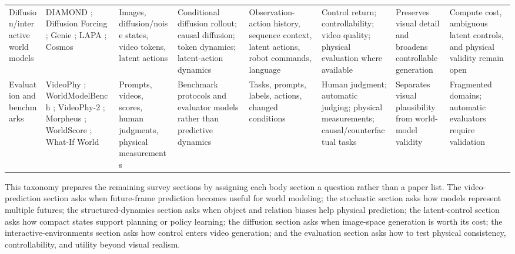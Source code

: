 \begin{table}[t]
\begin{tabular}{p{} p{} p{} p{} p{} p{} p{} p{}}
Diffusion/interactive world models & DIAMOND \cite{alonso2024_diamond_prov}; Diffusion Forcing \cite{chen2024diffusion_forcing_prov}; Genie \cite{bruce2024_genie_prov}; LAPA \cite{ye2025lapa_prov}; Cosmos \cite{nvidia2025cosmos} & Images, diffusion/noise states, video tokens, latent actions & Conditional diffusion rollout; causal diffusion; token dynamics; latent-action dynamics & Observation-action history, sequence context, latent actions, robot commands, language & Control return; controllability; video quality; physical evaluation where available & Preserves visual detail and broadens controllable generation & Compute cost, ambiguous latent controls, and physical validity remain open \\
Evaluation and benchmarks & VideoPhy \cite{bansal2025_videophy_prov}; WorldModelBench \cite{li2025worldmodelbench_prov}; VideoPhy-2 \cite{bansal2025videophy2_prov}; Morpheus \cite{zhang2025morpheus_prov}; WorldScore \cite{duan2025worldscore}; What-If World \cite{cai2026whatifworld_prov} & Prompts, videos, scores, human judgments, physical measurements & Benchmark protocols and evaluator models rather than predictive dynamics & Tasks, prompts, labels, actions, changed conditions & Human judgment; automatic judging; physical measurements; causal/counterfactual tasks & Separates visual plausibility from world-model validity & Fragmented domains; automatic evaluators require validation \\
\bottomrule
\end{tabular}
\end{table}

This taxonomy prepares the remaining survey sections by assigning each body section a question rather than a paper list. The video-prediction section asks when future-frame prediction becomes useful for world modeling; the stochastic section asks how models represent multiple futures; the structured-dynamics section asks when object and relation biases help physical prediction; the latent-control section asks how compact states support planning or policy learning; the diffusion section asks when image-space generation is worth its cost; the interactive-environments section asks how control enters video generation; and the evaluation section asks how to test physical consistency, controllability, and utility beyond visual realism.
